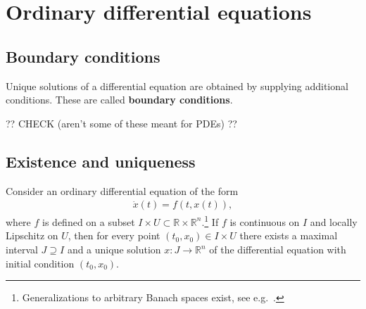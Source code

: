 \chapter{Ordinary differential equations}

\section{Boundary conditions}

    Unique solutions of a differential equation are obtained by supplying additional conditions. These are called \textbf{boundary conditions}.




    ?? CHECK (aren't some of these meant for PDEs) ??

\section{Existence and uniqueness}

    \begin{theorem}\label{ode:picard_lindelof}
        Consider an ordinary differential equation of the form
        \begin{gather}
            \dot{x}(t) = f(t,x(t)),
        \end{gather}
        where $f$ is defined on a subset $I\times U\subset\mathbb{R}\times\mathbb{R}^n$.\footnote{Generalizations to arbitrary Banach spaces exist, see e.g.~\cite{AMP1}.} If $f$ is continuous on $I$ and locally Lipschitz on $U$, then for every point $(t_0,x_0)\in I\times U$ there exists a maximal interval $J\supseteq I$ and a unique solution $x:J\rightarrow\mathbb{R}^n$ of the differential equation with initial condition $(t_0,x_0)$.
    \end{theorem}

